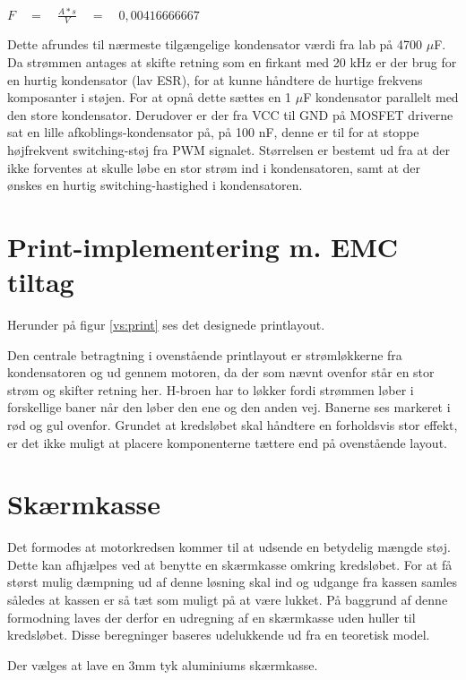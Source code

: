 $F\quad =\quad \frac { A*s }{ V } \quad =\quad 0,00416666667$

Dette afrundes til nærmeste tilgængelige kondensator værdi fra lab på 4700 $\mu$F.
Da strømmen antages at skifte retning som en firkant med 20 kHz er der brug for en hurtig kondensator (lav ESR), for at kunne håndtere de hurtige frekvens komposanter i støjen. For at opnå dette sættes en 1 $\mu$F kondensator parallelt med den store kondensator.
Derudover er der fra VCC til GND på MOSFET driverne sat en lille afkoblings-kondensator på, på 100 nF, denne er til for at stoppe højfrekvent switching-støj fra PWM signalet. Størrelsen er bestemt ud fra at der ikke forventes at skulle løbe en stor strøm ind i kondensatoren, samt at der ønskes en hurtig switching-hastighed i kondensatoren.

\newpage

\section{Print-implementering m. EMC tiltag}

Herunder på figur \ref{vs:print} ses det designede printlayout.


Den centrale betragtning i ovenstående printlayout er strømløkkerne fra kondensatoren og ud gennem motoren, da der som nævnt ovenfor står en stor strøm og skifter retning her. H-broen har to løkker fordi strømmen løber i forskellige baner når den løber den ene og den anden vej. Banerne ses markeret i rød og gul ovenfor. Grundet at kredsløbet skal håndtere en forholdsvis stor effekt, er det ikke muligt at placere komponenterne tættere end på ovenstående layout. 

\section{Skærmkasse}

Det formodes at motorkredsen kommer til at udsende en betydelig mængde støj. Dette kan afhjælpes ved at benytte en skærmkasse omkring kredsløbet. For at få størst mulig dæmpning ud af denne løsning skal ind og udgange fra kassen samles således at kassen er så tæt som muligt på at være lukket.
På baggrund af denne formodning laves der derfor en udregning af en skærmkasse uden huller til kredsløbet. Disse beregninger baseres udelukkende ud fra en teoretisk model. 

Der vælges at lave en 3mm tyk aluminiums skærmkasse. 

